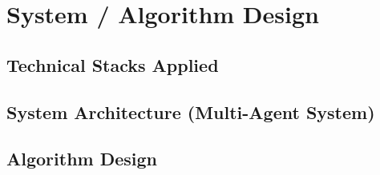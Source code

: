 \section{System / Algorithm Design}

\subsection{Technical Stacks Applied}



\subsection{System Architecture (Multi-Agent System)}



\medskip


\medskip


\medskip


\subsection{Algorithm Design}



\medskip


\medskip


\medskip


\medskip


\medskip

